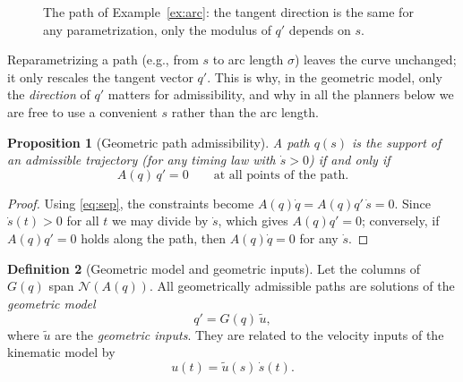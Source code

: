 \documentclass[11pt,a4paper]{article}
\def\boldsymbol#1{#1}%
\newcommand{\Null}{\mathcal{N}}
\newcommand{\q}{\boldsymbol{q}}
\newcommand{\qi}{\boldsymbol{q}_i}
\newcommand{\qf}{\boldsymbol{q}_f}
\newcommand{\ut}{\tilde{\boldsymbol{u}}}
\theoremstyle{definition}
\newtheorem{definition}{Definition}[section]
\theoremstyle{plain}
\newtheorem{proposition}[definition]{Proposition}
\theoremstyle{remark}
\begin{document}
\begin{figure}[H]
\centering
{}
\caption{The path of Example~\ref{ex:arc}: the tangent direction is the same for any parametrization, only the modulus of $\q'$ depends on $s$.}
\end{figure}

\begin{intuition}
Reparametrizing a path (e.g., from $s$ to arc length $\sigma$) leaves the curve unchanged; it only rescales the tangent vector
$\q'$. This is why, in the geometric model, only the \emph{direction} of $\q'$ matters for admissibility, and why in all the planners
below we are free to use a convenient $s$ rather than the arc length.
\end{intuition}

\begin{proposition}[Geometric path admissibility]\label{prop:geoadm}
A path $\q(s)$ is the support of an admissible trajectory (for any timing law with $\dot s>0$) if and only if
\begin{equation}
A(\q)\,\q'=0 \qquad\text{at all points of the path.}
\end{equation}
\end{proposition}
\begin{proof}
Using \eqref{eq:sep}, the constraints become $A(\q)\dot{\q}=A(\q)\q'\,\dot s=0$. Since $\dot s(t)>0$ for all $t$ we may divide
by $\dot s$, which gives $A(\q)\q'=0$; conversely, if $A(\q)\q'=0$ holds along the path, then $A(\q)\dot\q=0$ for any
$\dot s$. \qedhere
\end{proof}

\begin{definition}[Geometric model and geometric inputs]
Let the columns of $G(\q)$ span $\Null(A(\q))$. All geometrically admissible paths are solutions of the
\emph{geometric model}
\begin{equation}
\q'=G(\q)\,\ut,
\end{equation}
where $\ut$ are the \emph{geometric inputs}. They are related to the velocity inputs of the kinematic model by
\begin{equation}
\boldsymbol{u}(t)=\ut(s)\,\dot s(t).
\end{equation}
\end{definition}
\end{document}
